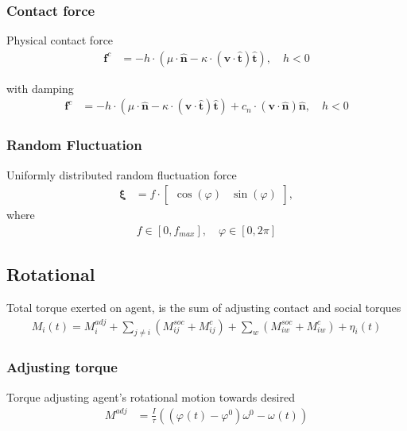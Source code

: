 \subsubsection{Contact force}
Physical contact force
\begin{align}
\mathbf{f}^{c} &= - h \cdot \left(\mu \cdot \hat{\mathbf{n}} - \kappa \cdot (\mathbf{v} \cdot \hat{\mathbf{t}}) \hat{\mathbf{t}}\right), \quad h < 0
\end{align}

with damping
\begin{align}
\mathbf{f}^{c} &= - h \cdot \left(\mu \cdot \hat{\mathbf{n}} - \kappa \cdot (\mathbf{v} \cdot \hat{\mathbf{t}}) \hat{\mathbf{t}}\right) + c_{n} \cdot (\mathbf{v} \cdot \hat{\mathbf{n}}) \hat{\mathbf{n}} , \quad h < 0
\end{align}


\subsubsection{Random Fluctuation}
Uniformly distributed random fluctuation force
\begin{align}
\boldsymbol{\xi} &= f \cdot \begin{bmatrix} \cos(\varphi) & \sin(\varphi) \end{bmatrix},
\end{align}
where
\begin{align}
f \in [0, f_{max}],\quad \varphi \in [0, 2 \pi]
\end{align}


\subsection{Rotational}
Total torque exerted on agent, is the sum of adjusting contact and social torques
\begin{align}
M_{i}(t) = M_{i}^{adj} + \sum_{j\neq i}^{} \left(M_{ij}^{soc} + M_{ij}^{c}\right) + \sum_{w}^{} \left(M_{iw}^{soc} + M_{iw}^{c}\right) + \eta_{i}(t)
\end{align}


\subsubsection{Adjusting torque}
Torque adjusting agent's rotational motion towards desired
\begin{align}
M_{}^{adj} &= \frac{I_{}}{\tau_{}} \left((\varphi_{}(t) - \varphi_{}^{0}) \omega_{}^{0} - \omega_{}(t)\right) \\
\end{align}

